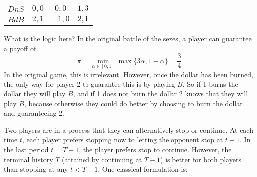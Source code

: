\documentclass[10pt]{article}
\begin{document}
\begin{example}
\begin{center}
\begin{tabular}{c|ccc}
		$DnS$ & $0,0$ & $0,0$ & $1,3$ \\
		$BdB$ & $2,1$ & $-1,0$ & $2,1$
		\end{tabular}
	\end{center}
	What is the logic here? In the original battle of the sexes, a player can guarantee a payoff of \[\pi=\min_{\alpha\in[0,1]} \max \{3\alpha,1-\alpha\} = \frac{3}{4}\]In the original game, this is irrelevant. However, once the dollar has been burned, the only way for player 2 to guarantee this is by playing $B$. So if 1 burns the dollar they will play $B$, and if 1 does not burn the dollar 2 knows that they will play $B$, because otherwise they could do better by choosing to burn the dollar and guaranteeing 2.
\end{example}


\begin{example}
	 Two players are in a process that they can alternatively stop or continue. At each time $t$, each player prefers stopping now to letting the opponent stop at $t+1$. In the last period $t = T-1$, the player prefers stop to continue. However, the terminal history $T$ (attained by continuing at $T-1$) is better for both players than stopping at any $t < T-1$. One classical formulation is:
	\begin{figure}[H]
	\centering
\end{figure}
\end{example}
\end{document}
